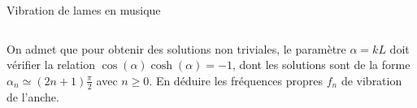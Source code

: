\begin{exo}[PC][3][exp]{Vibration de lames en musique}
\begin{quest}
{$$        $$
          }
    \item On admet que pour obtenir des solutions non triviales, le paramètre $\alpha=kL$ doit vérifier la relation $\cos(\alpha)\cosh(\alpha)=-1$, dont les solutions sont de la forme $\alpha_n \simeq (2n+1)\frac{\pi}{2}$ avec $n\geq0$. En déduire les fréquences propres $f_n$ de vibration de l’anche. 

  \end{quest}

\end{exo}
  
